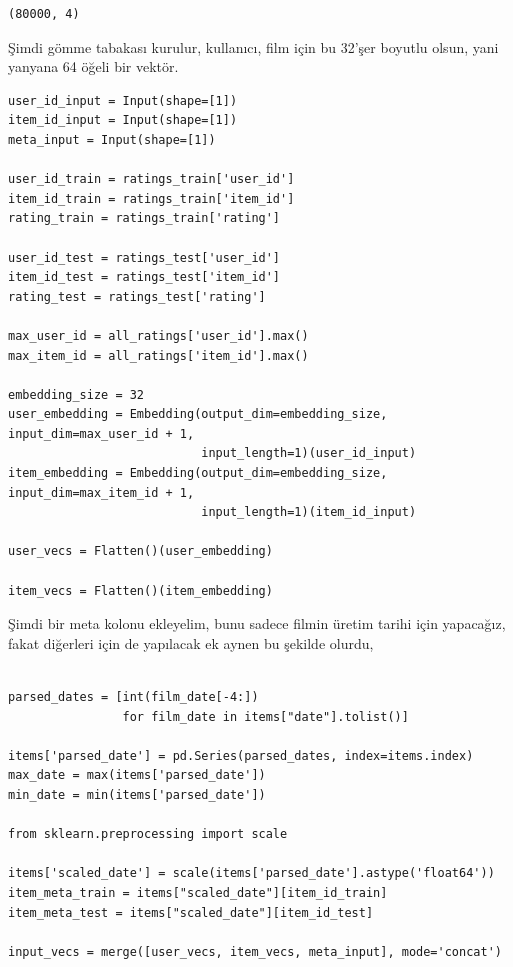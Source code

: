 \documentclass[12pt,fleqn]{article}\usepackage{../../common}
\begin{document}
\begin{verbatim}
(80000, 4)
\end{verbatim}

Şimdi gömme tabakası kurulur, kullanıcı, film için bu 32'şer boyutlu olsun,
yani yanyana 64 öğeli bir vektör. 

\begin{verbatim}
user_id_input = Input(shape=[1])
item_id_input = Input(shape=[1])
meta_input = Input(shape=[1])

user_id_train = ratings_train['user_id']
item_id_train = ratings_train['item_id']
rating_train = ratings_train['rating']

user_id_test = ratings_test['user_id']
item_id_test = ratings_test['item_id']
rating_test = ratings_test['rating']

max_user_id = all_ratings['user_id'].max()
max_item_id = all_ratings['item_id'].max()

embedding_size = 32
user_embedding = Embedding(output_dim=embedding_size, input_dim=max_user_id + 1,
                           input_length=1)(user_id_input)
item_embedding = Embedding(output_dim=embedding_size, input_dim=max_item_id + 1,
                           input_length=1)(item_id_input)

user_vecs = Flatten()(user_embedding)

item_vecs = Flatten()(item_embedding)
\end{verbatim}

Şimdi bir meta kolonu ekleyelim, bunu sadece filmin üretim tarihi için
yapacağız, fakat diğerleri için de yapılacak ek aynen bu şekilde olurdu,

\begin{verbatim}

parsed_dates = [int(film_date[-4:])
                for film_date in items["date"].tolist()]

items['parsed_date'] = pd.Series(parsed_dates, index=items.index)
max_date = max(items['parsed_date'])
min_date = min(items['parsed_date'])

from sklearn.preprocessing import scale

items['scaled_date'] = scale(items['parsed_date'].astype('float64'))
item_meta_train = items["scaled_date"][item_id_train]
item_meta_test = items["scaled_date"][item_id_test]

input_vecs = merge([user_vecs, item_vecs, meta_input], mode='concat')
\end{verbatim}
\end{document}
